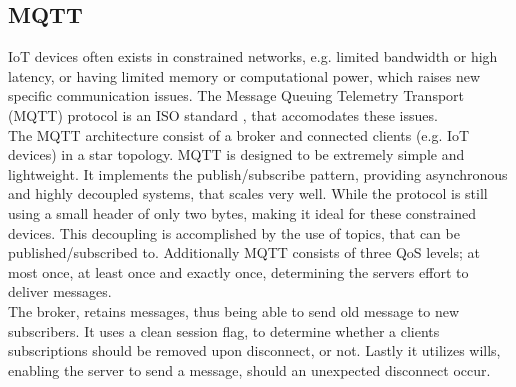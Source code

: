\subsection{MQTT}
IoT devices often exists in constrained networks, e.g. limited bandwidth or high latency, or having limited memory or computational power, which raises new specific communication issues. The Message Queuing Telemetry Transport (MQTT) protocol is an ISO standard \cite{developing_standards_2016}, that accomodates these issues.\\

The MQTT architecture consist of a broker and connected clients (e.g. IoT devices) in a star topology. MQTT is designed to be extremely simple and lightweight. It implements the publish/subscribe pattern, providing asynchronous and highly decoupled systems, that scales very well. While the protocol is still using a small header of only two bytes, making it ideal for these constrained devices. This decoupling is accomplished by the use of topics, that can be published/subscribed to. Additionally MQTT consists of three QoS levels; at most once, at least once and exactly once, determining the servers effort to deliver messages\cite{MQTTBook}.\\

The broker, retains messages, thus being able to send old message to new subscribers. It uses a clean session flag, to determine whether a clients subscriptions should be removed upon disconnect, or not. Lastly it utilizes wills, enabling the server to send a message, should an unexpected disconnect occur\cite{MQTTBook}.